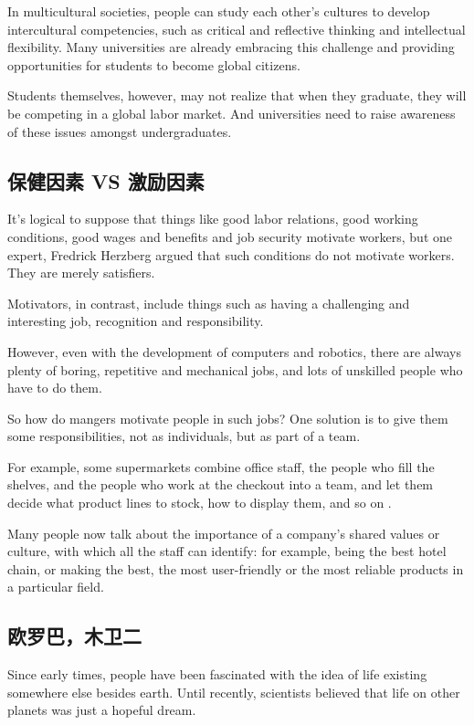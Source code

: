 In multicultural societies, people can study each other's
cultures to develop intercultural competencies, such as
critical and reflective thinking and intellectual flexibility.
Many universities are already embracing this challenge
and providing opportunities for students to become global
citizens.

Students themselves, however, may not realize that
when they graduate, they will be competing in a global
labor market. And universities need to raise awareness of
these issues amongst undergraduates.
\subsection{保健因素 VS 激励因素}
\begin{margintable}\vspace{-2cm}\footnotesize
\end{margintable}
It's logical to suppose that things like good labor relations,
good working conditions, good wages and benefits and
job security motivate workers, but one expert, Fredrick
Herzberg argued that such conditions do not motivate
workers. They are merely satisfiers.

Motivators, in contrast, include things
such as having a challenging and interesting job, recognition
and responsibility.

However, even with the development of computers
and robotics, there are always plenty of boring, repetitive
and mechanical jobs, and lots of unskilled people who
have to do them.

So how do mangers motivate people in such jobs? One
solution is to give them some responsibilities, not as individuals,
but as part of a team.

For example, some supermarkets combine office
staff, the people who fill the shelves, and the people who
work at the checkout into a team, and let them decide
what product lines to stock, how to display them, and so
on .

Many people now talk about the importance of a company's
shared values or culture, with which all the staff
can identify: for example, being the best hotel chain, or
making the best, the most user-friendly or the most reliable
products in a particular field.
\subsection{欧罗巴，木卫二}
\begin{margintable}\vspace{-2cm}\footnotesize
\end{margintable}
Since early times, people have been fascinated with the
idea of life existing somewhere else besides earth.
Until recently, scientists believed that life on other planets
was just a hopeful dream.

